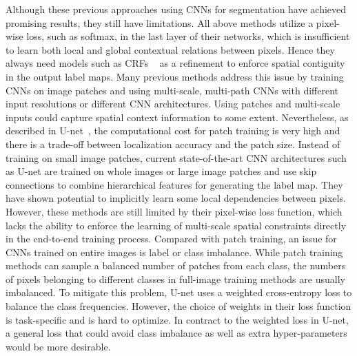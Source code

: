 \documentclass[twocolumn]{svjour3}
\begin{document}
Although these previous approaches using CNNs for segmentation have achieved promising results, they still have limitations.  All above methods utilize a pixel-wise loss, such as softmax, in the last layer of their networks, which is insufficient to learn both local and global contextual relations between pixels.  Hence they always need models such as CRFs ~\cite{chen14semantic} as a refinement to enforce spatial contiguity in the output label maps. Many previous methods \cite{havaei2017brain,kamnitsas2017efficient,pereira2016brain} address this issue by training CNNs on image patches and using multi-scale, multi-path CNNs with different input resolutions or different CNN architectures. Using patches and multi-scale inputs could capture spatial context information to some extent.
Nevertheless, as described in U-net~\cite{ronneberger2015u}, the computational cost for patch training is very high and there is a trade-off between localization accuracy and the patch size.
Instead of training on small image patches, current state-of-the-art CNN architectures  such as U-net are trained on whole images or large image patches and use skip connections to combine hierarchical features for generating the label map. They have shown potential to implicitly learn some local dependencies between pixels. However, these methods are still limited by their pixel-wise loss function, which lacks the ability to enforce the learning of multi-scale spatial constraints directly in the end-to-end training process.
Compared with patch training, an issue for CNNs trained on entire images is label or class imbalance. While patch training methods can sample a balanced number of patches from each class, the numbers of pixels belonging to different classes in full-image training methods are usually imbalanced. To mitigate this problem, U-net uses a weighted cross-entropy loss to balance the class frequencies. However, the choice of weights in their loss function is task-specific and is hard to optimize. In contract to the weighted loss in U-net, a general loss that could avoid class imbalance as well as extra hyper-parameters would be more desirable.
\end{document}
